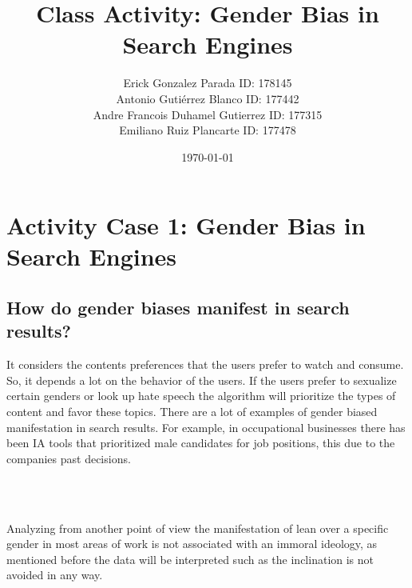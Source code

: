 \documentclass[twoside]{article}
\begin{document}

\renewcommand{\footrulewidth}{1pt}

\title{Class Activity: Gender Bias in Search Engines}
\author{Erick Gonzalez Parada ID: 178145 \\ \vspace{2mm}
Antonio Gutiérrez Blanco ID: 177442 \\ \vspace{2mm}
Andre Francois Duhamel Gutierrez ID: 177315 \\ \vspace{2mm}
Emiliano Ruiz Plancarte ID: 177478}
\date{\today}


\maketitle

\newpage

\section*{Activity Case 1: Gender Bias in Search Engines}

\subsection*{How do gender biases manifest in search results?}
\begin{justifying}
It considers the contents preferences that the users prefer to watch and consume. So, it depends a lot on the behavior of the users. If the users prefer to sexualize certain genders or look up hate speech the algorithm will prioritize the types of content and favor these topics. There are a lot of examples of gender biased manifestation in search results. For example, in occupational businesses there has been IA tools that prioritized male candidates for job positions, this due to the companies past decisions.
\end{justifying}
\\
\\
\begin{justifying}
Analyzing from another point of view the manifestation of lean over a specific gender in most areas of work is not associated with an immoral ideology, as mentioned before the data will be interpreted such as the inclination is not avoided in any way.
\end{justifying}
\end{document}
